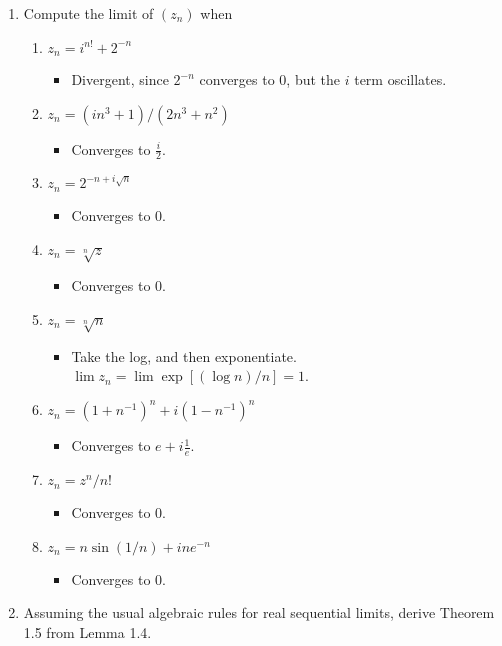\documentclass[11pt, a4paper, latinreim, shortsets]{notes}
\begin{document}
\begin{enumerate}[label={\bfseries II.5.\arabic*}]
	\item Compute the limit of $(z_n)$ when
	\begin{enumerate}[label=(\roman*)]
		\item $z_n = i^{n!} + 2^{-n}$
			\begin{itemize}
				\item[] Divergent, since $2^{-n}$ converges to 0, but the $i$ term oscillates.
			\end{itemize}
		\item $z_n = (in^3 + 1)/(2n^3+n^2)$
			\begin{itemize}
				\item[] Converges to $\frac{i}{2}$.
			\end{itemize}
		\item $z_n = 2^{-n + i\sqrt{n}}$
			\begin{itemize}
				\item[] Converges to 0.
			\end{itemize}
		\item $z_n = \sqrt[n]{z}$
			\begin{itemize}
				\item[] Converges to 0.
			\end{itemize}
		\item $z_n = \sqrt[n]{n}$
			\begin{itemize}
				\item[] Take the log, and then exponentiate. $\lim z_n = \lim \exp [(\log n)/n]=1$. 
			\end{itemize}
		\item $z_n = (1+n^{-1})^n + i(1-n^{-1})^n$
			\begin{itemize}
				\item[] Converges to $e + i\frac{1}{e}$.
			\end{itemize}
		\item $z_n = z^n/n!$
			\begin{itemize}
				\item[] Converges to 0.
			\end{itemize}
		\item $z_n = n\sin(1/n) + ine^{-n}$
			\begin{itemize}
				\item[] Converges to 0.
			\end{itemize}
	\end{enumerate}

\item Assuming the usual algebraic rules for real sequential limits, derive Theorem 1.5 from Lemma 1.4.


\end{enumerate}
\end{document}
